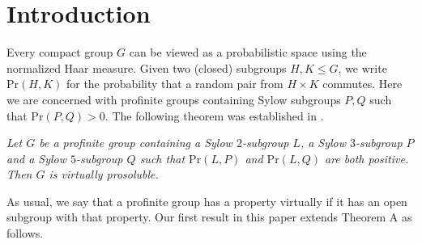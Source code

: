 \documentclass[12pt]{amsart}
\newcommand{\pr }{\mathrm{Pr} }
\begin{document}
\begin{abstract} Given two (closed) subgroups $H,K$ of a profinite group $G$, we write $\pr(H,K)$ for the probability that a random pair from $H\times K$ commutes. Here we are concerned with profinite groups containing Sylow subgroups $P,Q$ such that $\pr(P,Q)>0$. First, we show that if $G$ is a profinite group containing a Sylow $2$-subgroup $L$ and a Sylow $p$-subgroup $P$, where $p$ is odd, such that $\pr(L,P)$ is positive, then $G$ is virtually pro-$p$-soluble (Theorem \ref{main1}). Then we handle similar issues for profinite groups admitting coprime automorphisms. In particular, we prove that if $G$ is a profinite group admitting a group of coprime automorphisms $A$ such that there is a Sylow $2$-subgroup $L$ of $C_G(A)$ and an $A$-invariant Sylow $p$-subgroup $P$ of $G$, where $p$ is odd, for which $\pr(L,P)>0$, then $G$ is virtually pro-$p$-soluble (Theorem \ref{main3}). On the other hand, if we only have $\pr([L,A],[P,A])>0$, then $[G,A]$ need not be virtually pro-$p$-soluble. We show that in this case $[G,A]$ has an open normal subgroup of non-$p$-soluble length at most $1$ (Theorem \ref{main44}). Furthermore, if $P$ is an $A$-invariant Sylow $p$-subgroup of $G$ such that $\pr([P,A],[P,A]^x)>0$ for every $x\in G$, then $[G,A]$ has an open normal subgroup of non-$p$-soluble length at most $1$ (Theorem \ref{main5}).
\end{abstract}
 \maketitle

\section{Introduction}

Every compact group $G$ can be viewed as a probabilistic space using the normalized Haar measure. Given two (closed) subgroups $H,K\leq G$, we write $\pr(H,K)$ for the probability that a random pair from $H\times K$ commutes. Here we are concerned with profinite groups containing Sylow subgroups $P,Q$ such that $\pr(P,Q)>0$. The following theorem was established in \cite{MZ}.\medskip

 {\it Let $G$ be a profinite group containing a Sylow $2$-subgroup $L$, a Sylow $3$-subgroup $P$ and a Sylow $5$-subgroup $Q$ such that $\pr(L,P)$ and $\pr(L,Q)$ are both positive. Then $G$ is virtually prosoluble.}
\medskip

As usual, we say that a profinite group has a property virtually if it has an open subgroup with that property. Our first result in this paper extends Theorem A as follows.
\end{document}
